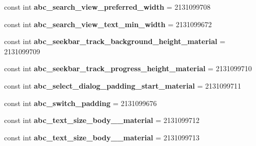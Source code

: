 \begin{DoxyCompactItemize}
const int {\bfseries abc\+\_\+search\+\_\+view\+\_\+preferred\+\_\+width} = 2131099708
\item 
\mbox{\label{class_sample_app_1_1_droid_1_1_resource_1_1_dimension_a866309f4d04f82a031cd4d568fd3aafe}} 
const int {\bfseries abc\+\_\+search\+\_\+view\+\_\+text\+\_\+min\+\_\+width} = 2131099672
\item 
\mbox{\label{class_sample_app_1_1_droid_1_1_resource_1_1_dimension_a3affbe1409ec8fdd5b302f5eeaca50b1}} 
const int {\bfseries abc\+\_\+seekbar\+\_\+track\+\_\+background\+\_\+height\+\_\+material} = 2131099709
\item 
\mbox{\label{class_sample_app_1_1_droid_1_1_resource_1_1_dimension_a7949a7bde26e3eb5111005f088e61440}} 
const int {\bfseries abc\+\_\+seekbar\+\_\+track\+\_\+progress\+\_\+height\+\_\+material} = 2131099710
\item 
\mbox{\label{class_sample_app_1_1_droid_1_1_resource_1_1_dimension_a7c578c7b6fef95512aeedb6a3f3f73e8}} 
const int {\bfseries abc\+\_\+select\+\_\+dialog\+\_\+padding\+\_\+start\+\_\+material} = 2131099711
\item 
\mbox{\label{class_sample_app_1_1_droid_1_1_resource_1_1_dimension_a09e03599432997d847f549f64478899e}} 
const int {\bfseries abc\+\_\+switch\+\_\+padding} = 2131099676
\item 
\mbox{\label{class_sample_app_1_1_droid_1_1_resource_1_1_dimension_ac0c7a4836d6f1f26cc68f15afc708044}} 
const int {\bfseries abc\+\_\+text\+\_\+size\+\_\+body\+\_\+\_\+material} = 2131099712
\item 
\mbox{\label{class_sample_app_1_1_droid_1_1_resource_1_1_dimension_a8c680550b2ccc798545e3b9c172ea6ec}} 
const int {\bfseries abc\+\_\+text\+\_\+size\+\_\+body\+\_\+\_\+material} = 2131099713
\item 
\mbox{\label{class_sample_app_1_1_droid_1_1_resource_1_1_dimension_a5c9879a5831e76122c0cbe7c21744653}} 

\end{DoxyCompactItemize}
